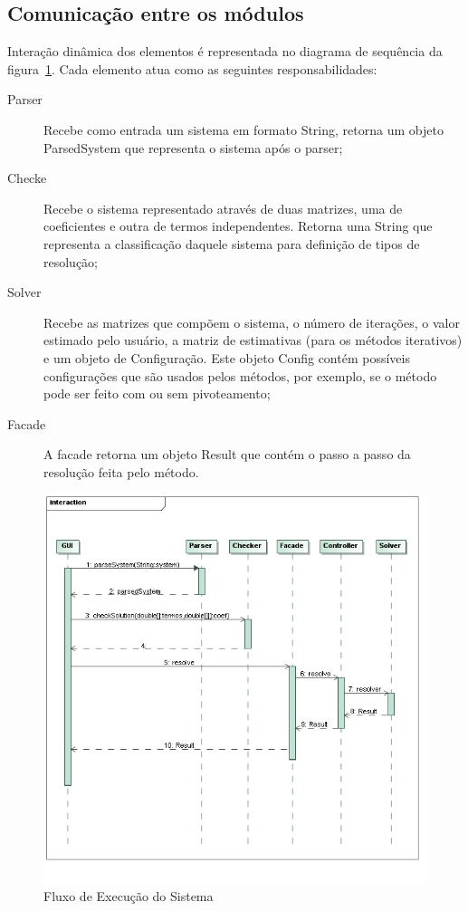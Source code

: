 \documentclass[a4paper,10pt]{report}
\begin{document}
\subsection{Comunicação entre os módulos}

Interação dinâmica dos elementos é representada no diagrama de sequência da figura~\ref{fig:fluxo}. Cada elemento atua como as seguintes responsabilidades:

\begin{description}
 \item[Parser] Recebe como entrada um sistema em formato String, retorna um objeto ParsedSystem que representa o sistema após o parser;
 \item[Checke] Recebe o sistema representado através de duas matrizes, uma de coeficientes e outra de termos independentes. Retorna uma String que representa a classificação daquele sistema para definição de tipos de resolução;
 \item[Solver] Recebe as matrizes que compõem o sistema, o número de iterações, o valor estimado pelo usuário, a matriz de estimativas (para os métodos iterativos) e um objeto de Configuração. Este objeto Config contém possíveis configurações que são usados pelos métodos, por exemplo, se o método pode ser feito com ou sem pivoteamento;
 \item[Facade] A facade retorna um objeto Result que contém o passo a passo da resolução feita pelo método.
\end{description}

\begin{figure}[ht]
 \centering
 \includegraphics[width=\textwidth]{MSNFlow}
 \caption{Fluxo de Execução do Sistema}
 \label{fig:fluxo}
\end{figure}
\end{document}

